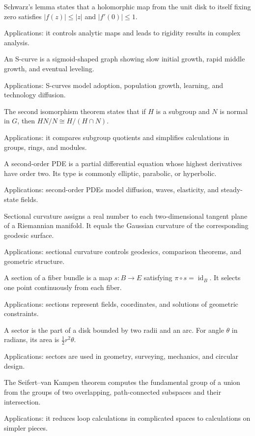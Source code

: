 Schwarz's lemma states that a holomorphic map from the unit disk to itself fixing zero satisfies $|f(z)|\leq|z|$ and $|f'(0)|\leq1$. \par\noindent Applications: it controls analytic maps and leads to rigidity results in complex analysis.

An S-curve is a sigmoid-shaped graph showing slow initial growth, rapid middle growth, and eventual leveling. \par\noindent Applications: S-curves model adoption, population growth, learning, and technology diffusion.

The second isomorphism theorem states that if $H$ is a subgroup and $N$ is normal in $G$, then $HN/N\cong H/(H\cap N)$. \par\noindent Applications: it compares subgroup quotients and simplifies calculations in groups, rings, and modules.

A second-order PDE is a partial differential equation whose highest derivatives have order two. Its type is commonly elliptic, parabolic, or hyperbolic. \par\noindent Applications: second-order PDEs model diffusion, waves, elasticity, and steady-state fields.

Sectional curvature assigns a real number to each two-dimensional tangent plane of a Riemannian manifold. It equals the Gaussian curvature of the corresponding geodesic surface. \par\noindent Applications: sectional curvature controls geodesics, comparison theorems, and geometric structure.

A section of a fiber bundle is a map $s:B\to E$ satisfying $\pi\circ s=\operatorname{id}_B$. It selects one point continuously from each fiber. \par\noindent Applications: sections represent fields, coordinates, and solutions of geometric constraints.

A sector is the part of a disk bounded by two radii and an arc. For angle $\theta$ in radians, its area is $\frac12r^2\theta$. \par\noindent Applications: sectors are used in geometry, surveying, mechanics, and circular design.

The Seifert--van Kampen theorem computes the fundamental group of a union from the groups of two overlapping, path-connected subspaces and their intersection. \par\noindent Applications: it reduces loop calculations in complicated spaces to calculations on simpler pieces.

